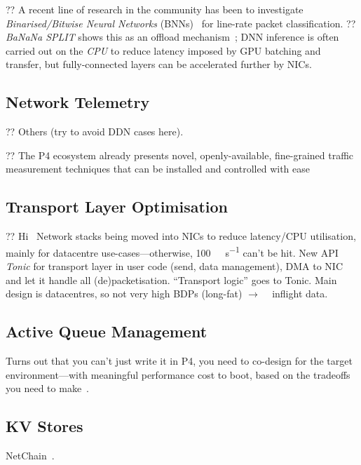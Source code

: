 ?? A recent line of research in the community has been to investigate \emph{Binarised/Bitwise Neural Networks} (BNNs)~\parencite{DBLP:conf/nips/HubaraCSEB16,DBLP:journals/corr/KimS16,DBLP:journals/corr/MiyashitaLM16} for line-rate packet classification.
?? \emph{BaNaNa SPLIT} shows this as an offload mechanism~\parencite{DBLP:conf/sigcomm/SanvitoSB18,DBLP:journals/corr/abs-1801-05731}; DNN inference is often carried out on the \emph{CPU} to reduce latency imposed by GPU batching and transfer, but fully-connected layers can be accelerated further by NICs.

\subsection{Network Telemetry}
?? Others (try to avoid DDN cases here).

?? The P4 ecosystem already presents novel, openly-available, fine-grained traffic measurement techniques that can be installed and controlled with ease~\parencite{DBLP:conf/sigcomm/GuptaHCFRW18,DBLP:conf/sigcomm/ChenFKRR18,DBLP:conf/sosr/GhasemiBR17}

\subsection{Transport Layer Optimisation}
?? Hi~\parencite{DBLP:conf/nsdi/ArashlooLGRWW20} Network stacks being moved into NICs to reduce latency/CPU utilisation, mainly for datacentre use-cases---otherwise, \SI{100}{\giga\bit\per\second} can't be hit. New API \emph{Tonic} for transport layer in user code (send, data management), DMA to NIC and let it handle all (de)packetisation. ``Transport logic'' goes to Tonic. Main design is datacentres, so not very high BDPs (long-fat) $\rightarrow$ \si{\kilo\byte} inflight data.

\subsection{Active Queue Management}
Turns out that you can't just write it in P4, you need to co-design for the target environment---with meaningful performance cost to boot, based on the tradeoffs you need to make~\parencite{Kunze-P4-AQM}.

\subsection{KV Stores}
NetChain~\parencite{DBLP:conf/nsdi/JinLZFLSKS18}.


